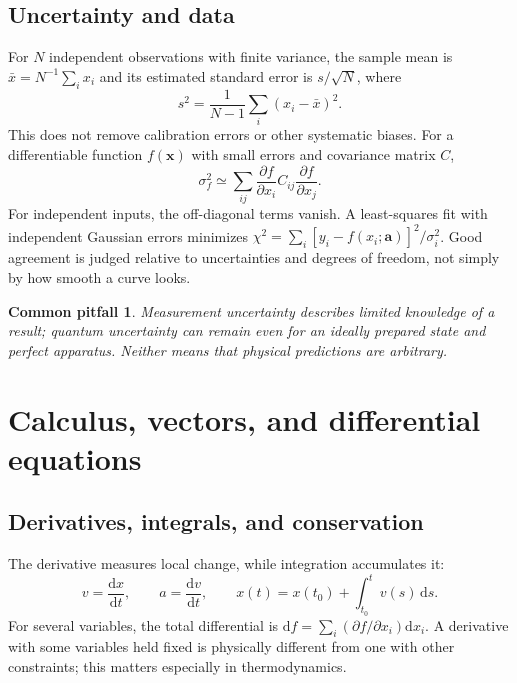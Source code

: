 \documentclass[11pt,oneside]{book}
\newcommand{\dd}{\mathrm{d}}
\newcommand{\vect}[1]{\boldsymbol{#1}}
\newcommand{\pd}[2]{\frac{\partial #1}{\partial #2}}
\newcommand{\od}[2]{\frac{\dd #1}{\dd #2}}
\theoremstyle{reviewstyle}
\newtheorem*{pitfall}{Common pitfall}
\begin{document}
\section{Uncertainty and data}
For $N$ independent observations with finite variance, the sample mean is $\bar x=N^{-1}\sum_i x_i$ and its estimated standard error is $s/\sqrt N$, where
\begin{equation}
s^2=\frac{1}{N-1}\sum_i(x_i-\bar x)^2.
\end{equation}
This does not remove calibration errors or other systematic biases. For a differentiable function $f(\vect x)$ with small errors and covariance matrix $C$,
\begin{equation}
\sigma_f^2\simeq\sum_{ij}\pd{f}{x_i}C_{ij}\pd{f}{x_j}.
\end{equation}
For independent inputs, the off-diagonal terms vanish. A least-squares fit with independent Gaussian errors minimizes
$\chi^2=\sum_i[y_i-f(x_i;\vect a)]^2/\sigma_i^2$.
Good agreement is judged relative to uncertainties and degrees of freedom, not simply by how smooth a curve looks.
\begin{pitfall}
Measurement uncertainty describes limited knowledge of a result; quantum uncertainty can remain even for an ideally prepared state and perfect apparatus. Neither means that physical predictions are arbitrary.
\end{pitfall}

\chapter{Calculus, vectors, and differential equations}
\section{Derivatives, integrals, and conservation}
The derivative measures local change, while integration accumulates it:
\begin{equation}
v=\od{x}{t},\qquad a=\od{v}{t},\qquad x(t)=x(t_0)+\int_{t_0}^t v(s)\,\dd s.
\end{equation}
For several variables, the total differential is $\dd f=\sum_i(\partial f/\partial x_i)\dd x_i$. A derivative with some variables held fixed is physically different from one with other constraints; this matters especially in thermodynamics.
\end{document}
